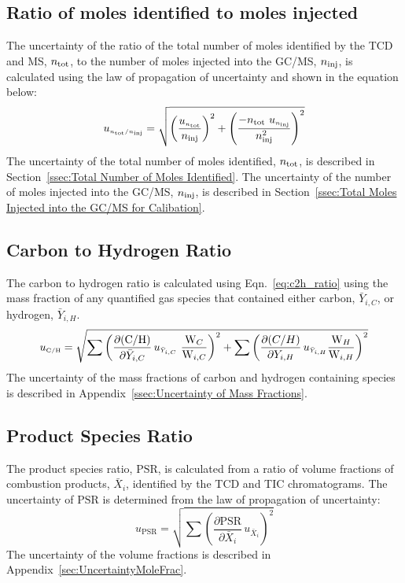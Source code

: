 \documentclass[12pt]{article}
\begin{document}
\subsection{Ratio of moles identified to moles injected }
\label{ssec:mole ratio}
The uncertainty of the ratio of the total number of moles identified by the TCD and MS, $n_{\rm tot}$, to the number of moles injected into the GC/MS, $n_{\rm inj}$, is calculated using the law of propagation of uncertainty and shown in the equation below:
\begin{equation}
\label{eq:mol_ratio_uncertainty}
u_{\scriptscriptstyle n_{\rm tot}/n_{\rm inj}} = \sqrt{\left(\frac{u_{\scriptscriptstyle n_{\rm tot}}}{n_{\rm inj}}\right)^2 + \left(\frac{-n_{\rm tot}~u_{\scriptscriptstyle n_{\rm inj}}}{{n_{\rm inj}^2}}\right)^2}
\end{equation}
The uncertainty of the total number of moles identified, $n_{\rm tot}$, is described in Section~\ref{ssec:Total Number of Moles Identified}. The uncertainty of the number of moles injected into the GC/MS, $n_{\rm inj}$, is described in Section~\ref{ssec:Total Moles Injected into the GC/MS for Calibation}.

\subsection{Carbon to Hydrogen Ratio}
\label{ssec:C2H_ratio}
The carbon to hydrogen ratio is calculated using Eqn.~\ref{eq:c2h_ratio} using the mass fraction of any quantified gas species that contained either carbon, $\bar{Y}_{i,C}$, or hydrogen, $\bar{Y}_{i,H}$.
\begin{equation}
\label{eq:c2h_uncertainty}
u_{\scriptscriptstyle {\rm C}/{\rm H}} = \sqrt{{\sum\left(\frac{\partial ({\rm C}/{\rm H})}{\partial \bar{Y}_{i,C}}\,u_{\scriptscriptstyle \bar{Y}_{i,C}}~{\frac{\textrm{W}_{C}}{\textrm{W}_{i,C}}} \right)}^2+{\sum\left(\frac{\partial ({C}/{H})}{\partial Y_{i,H}}\,u_{\scriptscriptstyle \bar{Y}_{i,H}}{\frac{\textrm{W}_{H}}{\textrm{W}_{i,H}}} \right)}^2}
\end{equation}
The uncertainty of the mass fractions of carbon and hydrogen containing species is described in Appendix~\ref{ssec:Uncertainty of Mass Fractions}.

\subsection{Product Species Ratio}
\label{ssec:Pro_ratio}
The product species ratio, $\text{PSR}$, is calculated from a ratio of volume fractions of combustion products, $\bar{X}_{i}$, identified by the TCD and TIC chromatograms. The uncertainty of $\text{PSR}$ is determined from the law of propagation of uncertainty:
\begin{equation}
\label{eq:c2h_ratio_uncertainty}
u_{\scriptscriptstyle \text{PSR}} = \sqrt{{\sum\left(\frac{\partial \text{PSR}}{\partial \bar{X}_{i}}\,u_{\scriptscriptstyle \bar{X}_{i}}\right)}^2}
\end{equation}
The uncertainty of the volume fractions is described in Appendix~\ref{sec:UncertaintyMoleFrac}.
\end{document}
